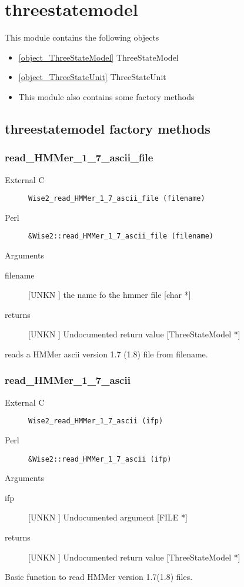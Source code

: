 \section{threestatemodel}
\label{module_threestatemodel}
This module contains the following objects

\begin{itemize}
\item \ref{object_ThreeStateModel} ThreeStateModel

\item \ref{object_ThreeStateUnit} ThreeStateUnit

\item This module also contains some factory methods
\end{itemize}
\subsection{threestatemodel factory methods}
\subsubsection{read_HMMer_1_7_ascii_file}
\begin{description}
\item[External C] {\tt Wise2_read_HMMer_1_7_ascii_file (filename)}
\item[Perl] {\tt &Wise2::read_HMMer_1_7_ascii_file (filename)}

\end{description}
Arguments
\begin{description}
\item[filename] [UNKN ] the name fo the hmmer file [char *]
\item[returns] [UNKN ] Undocumented return value [ThreeStateModel *]
\end{description}
reads a HMMer ascii version 1.7 (1.8) file from filename.




\subsubsection{read_HMMer_1_7_ascii}
\begin{description}
\item[External C] {\tt Wise2_read_HMMer_1_7_ascii (ifp)}
\item[Perl] {\tt &Wise2::read_HMMer_1_7_ascii (ifp)}

\end{description}
Arguments
\begin{description}
\item[ifp] [UNKN ] Undocumented argument [FILE *]
\item[returns] [UNKN ] Undocumented return value [ThreeStateModel *]
\end{description}
Basic function to read HMMer version 1.7(1.8) files.




